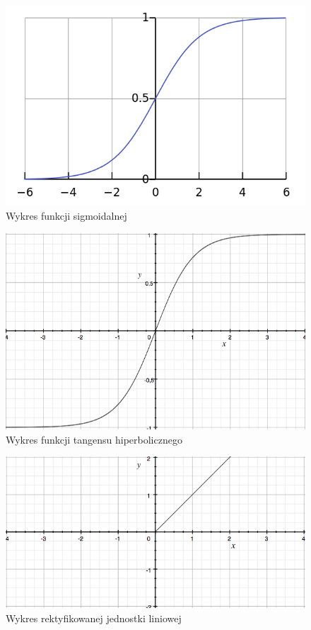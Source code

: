 \documentclass[12pt,a4paper,twoside,titlepage,openright]{book}
\begin{document}
\begin{figure}[h]
	\centering
			\includegraphics[resolution=100, scale=0.7]{Sigmoid.png}
		\caption{Wykres funkcji sigmoidalnej}
\end{figure}

\begin{figure}[h]
	\centering
			\includegraphics[resolution=100, scale=0.7]{Tangens.png}
		\caption{Wykres funkcji tangensu hiperbolicznego}
\end{figure}

\begin{figure}[h]
	\centering
			\includegraphics[resolution=100, scale=0.8]{ReLU.png}
		\caption{Wykres rektyfikowanej jednostki liniowej}
\end{figure}
\end{document}

